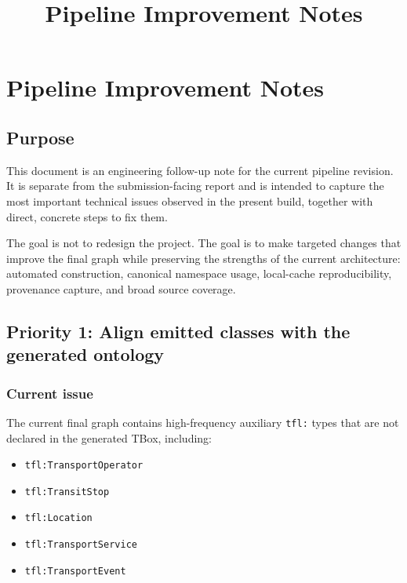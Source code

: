\documentclass[
  11pt,
  a4paper,
]{article}
\title{Pipeline Improvement Notes}
\author{}
\date{}
\providecommand{\tightlist}{%
  \setlength{\itemsep}{0pt}\setlength{\parskip}{0pt}}
\begin{document}
\maketitle

\section{Pipeline Improvement Notes}\label{pipeline-improvement-notes}

\subsection{Purpose}\label{purpose}

This document is an engineering follow-up note for the current pipeline
revision. It is separate from the submission-facing report and is
intended to capture the most important technical issues observed in the
present build, together with direct, concrete steps to fix them.

The goal is not to redesign the project. The goal is to make targeted
changes that improve the final graph while preserving the strengths of
the current architecture: automated construction, canonical namespace
usage, local-cache reproducibility, provenance capture, and broad source
coverage.

\subsection{Priority 1: Align emitted classes with the generated
ontology}\label{priority-1-align-emitted-classes-with-the-generated-ontology}

\subsubsection{Current issue}\label{current-issue}

The current final graph contains high-frequency auxiliary \texttt{tfl:}
types that are not declared in the generated TBox, including:

\begin{itemize}
\tightlist
\item
  \texttt{tfl:TransportOperator}
\item
  \texttt{tfl:TransitStop}
\item
  \texttt{tfl:Location}
\item
  \texttt{tfl:TransportService}
\item
  \texttt{tfl:TransportEvent}
\end{itemize}
\end{document}

